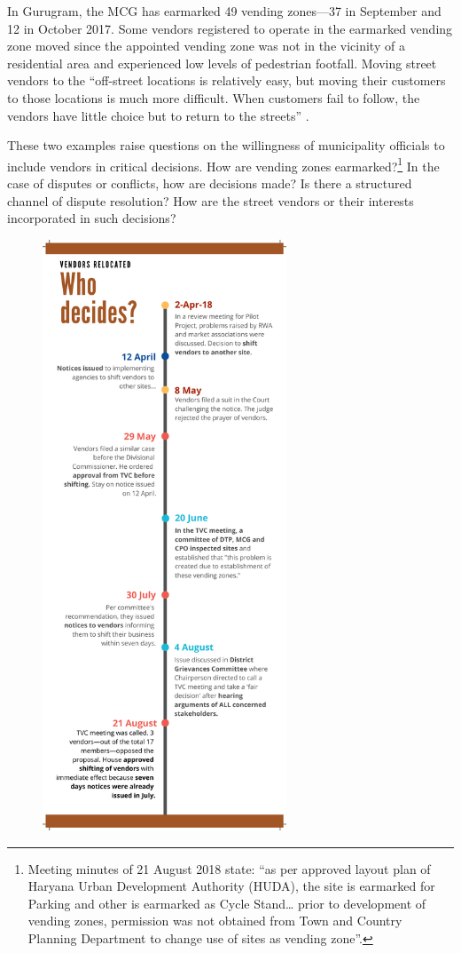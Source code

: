 \documentclass[a4paper, 12pt, twoside]{article}
\begin{document}
{{In Gurugram, the MCG has earmarked 49 vending zones—37 in September and 12 in October 2017. Some vendors registered to operate in  the earmarked vending zone  moved since the appointed vending zone was not in the vicinity of a residential area and experienced low levels of pedestrian footfall. Moving street vendors to the “off-street locations is relatively easy, but moving their customers to those locations is much more difficult. When customers fail to follow, the vendors have little choice but to return to the streets” \parencite{bromleypaper}.

These two examples raise questions on the willingness of municipality officials to include vendors in critical decisions. How are vending zones earmarked?\footnote{Meeting minutes of 21 August 2018 state: “as per approved layout plan of Haryana Urban Development Authority (HUDA), the site is earmarked for Parking and other is earmarked as Cycle Stand… prior to development of vending zones, permission was not obtained from Town and Country Planning Department to change use of sites as vending zone”.} In the case of disputes or conflicts, how are decisions made? Is there a structured channel of dispute resolution? How are the street vendors or their interests incorporated in such decisions?


\begin{figure}
\vspace{-10pt}
\hspace{-20pt}
\centering
\includegraphics[height=17.6cm]{WhoDecides.pdf}
\vspace{-40pt}
\end{figure}


}}
\end{document}
